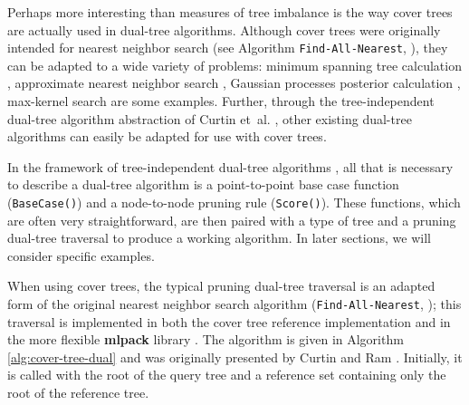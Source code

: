 Perhaps more interesting than measures of tree imbalance is the way cover trees
are actually used in dual-tree algorithms.  Although cover trees were originally
intended for nearest neighbor search (see Algorithm \texttt{Find-All-Nearest},
\cite{langford2006}), they can be adapted to a wide variety of problems: minimum
spanning tree calculation \cite{march2010fast}, approximate nearest neighbor
search \cite{ram2010rank}, Gaussian processes posterior calculation
\cite{moore2014fast}, max-kernel search \cite{curtin2013fast,
curtin2014dual} are some examples.  Further, through the tree-independent
dual-tree algorithm abstraction of Curtin et~al. \cite{curtin2013tree}, other
existing dual-tree algorithms can easily be adapted for use with cover trees.

In the framework of tree-independent dual-tree algorithms
\cite{curtin2013tree}, all that is necessary to describe a dual-tree algorithm
is a point-to-point base case function (\texttt{BaseCase()}) and a node-to-node
pruning rule (\texttt{Score()}).  These functions, which are often very
straightforward, are then paired with a type of tree and a pruning dual-tree
traversal to produce a working algorithm.  In later sections, we will consider
specific examples.

When using cover trees, the typical pruning dual-tree traversal is an adapted
form of the original nearest neighbor search algorithm
(\texttt{Find-All-Nearest}, \cite{langford2006}); this traversal is implemented
in both the cover tree reference implementation and in the more flexible {\bf
mlpack} library \cite{curtin2013mlpack}.  The algorithm is given in Algorithm
\ref{alg:cover-tree-dual} and was originally presented by Curtin and Ram
\cite{curtin2014dual}.  Initially, it is called with the root of the query tree
and a reference set containing only the root of the reference tree.

